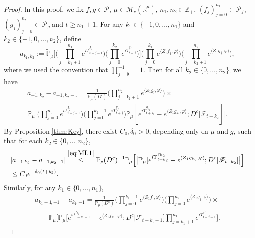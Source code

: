 \documentclass[12pt,a4paper]{amsart}
\theoremstyle{plain}
\theoremstyle{definition}
\numberwithin{equation}{section}
\begin{document}
\begin{proof}
	In this proof, we fix $f,g\in \mathcal P$, $\mu\in \mathcal M_c(\mathbb R^d)$, $n_1,n_2 \in \mathbb Z_+$, $(f_j)_{j=0}^{n_1}\subset \overline{\mathcal P}_f$, $(g_j)_{j=0}^{n_2}\subset \overline{\mathcal P}_g$ and $t\geq n_1 + 1$.
 	For any $k_1 \in \{-1,0,\dots,n_1\}$ and $k_2 \in \{-1,0,\dots,n_2\}$,  define
\[
    a_{k_1,k_2}
    :=  \mathbb{\widetilde{P}}_{\mu}\Big[ \Big(\prod_{j=k_1+1}^{n_1} e^{i\Upsilon_{t-j-1}^{f_j}} \Big)  \Big(\prod_{j=0}^{k_2}e^{i\Upsilon_{t+j}^{g_j}}\Big) \Big] \Big(\prod_{j=0}^{k_1}e^{\langle Z_1 f_j, \varphi\rangle}\Big) \Big(\prod_{j=k_2+1}^{n_2} e^{ \langle Z_1g_j,\varphi \rangle} \Big),
\]
	where we used the convention that $\prod_{j=0}^{-1} =1.$
  	Then for all  $k_2 \in \{0,\dots,n_2\}$, we have
\begin{equation}
\label{eq:MI.1}
\begin{multlined}
	 a_{-1,k_2} - a_{-1,k_2-1}
	 = \frac{1}{\mathbb{P}_{\mu}(D^c)}  \Big(\prod_{j=k_2+1}^{n_2}e^{\langle Z_1g_j, \varphi\rangle}\Big) \times {}
	\\ \mathbb{P}_{\mu}\Big[\Big(\prod_{j=0}^{n_1}e^{i\Upsilon_{t-j-1}^{f_j}}\Big)\Big(\prod_{j=0}^{k_2-1} e^{i\Upsilon_{t+j}^{g_j}}\Big) \mathbb P_\mu[e^{i\Upsilon^{g_{k_2}}_{t+k_2}}-e^{\langle Z_1g_{k_2}, \varphi\rangle}; D^c|\mathscr F_{t+k_2}] \Big].
\end{multlined}
\end{equation}
	By Proposition \ref{thm:Key}, there exist $C_0,\delta_0 >0$,  depending only on $\mu$ and $g$, such that  for each $k_2 \in \{0, \dots, n_2 \}$,
\begin{align}
    &| a_{-1,k_2} - a_{-1,k_2-1}|
    \overset{\eqref{eq:MI.1}}\leq \mathbb{P}_{\mu}(D^c)^{-1}\mathbb{P}_{\mu}\Big[\big|\mathbb P_\mu[e^{i\Upsilon^{g_{k_2}}_{t+k_2}}-e^{\langle Z_1g_{k_2}, \varphi\rangle}; D^c|\mathscr F_{t+k_2}]\big|\Big]
    \\&\label{eq:MI.15} \leq C_0 e^{-\delta_0 (t+k_2)}.
\end{align}
	Similarly, for any $k_1 \in \{0, \dots , n_1\}$,
\begin{equation}
\label{eq:MI.2}
\begin{multlined}
	a_{k_1-1,-1} - a_{k_1,-1}
	=  \frac{1}{\mathbb P_\mu(D^c)} \Big(\prod_{j=0}^{k_1-1}e^{\langle Z_1 f_j, \varphi\rangle}\Big) \Big(\prod_{j=0}^{n_2} e^{ \langle Z_1g_j,\varphi \rangle} \Big) \times {}
	\\ \qquad \mathbb{P}_{\mu}\Big[ \mathbb P_\mu\big[e^{i\Upsilon_{t-k_1-1}^{f_{k_1}}} -e^{\langle Z_1 f_{k_1}, \varphi\rangle}  ; D^c \big| \mathscr F_{t-k_1 - 1}\big] \prod_{j=k_1+1}^{n_1} e^{i\Upsilon_{t-j-1}^{f_j}} \Big] .

\end{multlined}
\end{equation}
\end{proof}
\end{document}
